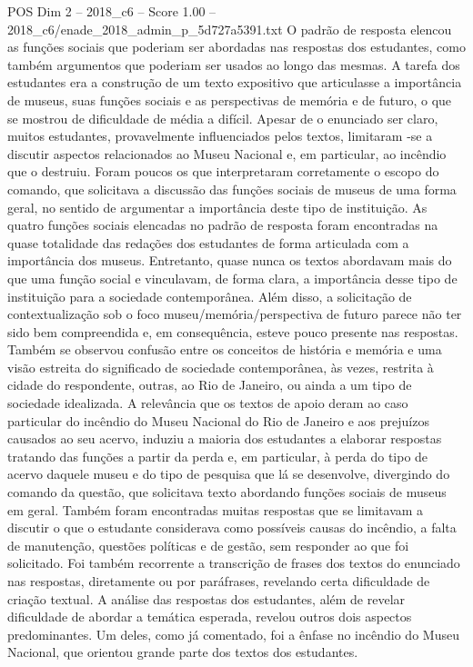 \begin{textsample}{POS Dim 2 – 2018\_c6 – Score 1.00 – 2018\_c6/enade\_2018\_admin\_p\_5d727a5391.txt}
O padrão de resposta elencou as funções sociais que poderiam ser abordadas nas respostas dos estudantes, como também argumentos que poderiam ser usados ao longo das mesmas.
A tarefa dos estudantes era a construção de um texto expositivo que articulasse a importância de museus, suas funções sociais e as perspectivas de memória e de futuro, o que se mostrou de dificuldade de média a difícil.
Apesar de o enunciado ser claro, muitos estudantes, provavelmente influenciados pelos textos, limitaram -se a discutir aspectos relacionados ao Museu Nacional e, em particular, ao incêndio que o destruiu.
Foram poucos os que interpretaram corretamente o escopo do comando, que solicitava a discussão das funções sociais de museus de uma forma geral, no sentido de argumentar a importância deste tipo de instituição.
As quatro funções sociais elencadas no padrão de resposta foram encontradas na quase totalidade das redações dos estudantes de forma articulada com a importância dos museus.
Entretanto, quase nunca os textos abordavam mais do que uma função social e vinculavam, de forma clara, a importância desse tipo de instituição para a sociedade contemporânea.
Além disso, a solicitação de contextualização sob o foco museu/memória/perspectiva de futuro parece não ter sido bem compreendida e, em consequência, esteve pouco presente nas respostas.
Também se observou confusão entre os conceitos de história e memória e uma visão estreita do significado de sociedade contemporânea, às vezes, restrita à cidade do respondente, outras, ao Rio de Janeiro, ou ainda a um tipo de sociedade idealizada.
A relevância que os textos de apoio deram ao caso particular do incêndio do Museu Nacional do Rio de Janeiro e aos prejuízos causados ao seu acervo, induziu a maioria dos estudantes a elaborar respostas tratando das funções a partir da perda e, em particular, à perda do tipo de acervo daquele museu e do tipo de pesquisa que lá se desenvolve, divergindo do comando da questão, que solicitava texto abordando funções sociais de museus em geral.
Também foram encontradas muitas respostas que se limitavam a discutir o que o estudante considerava como possíveis causas do incêndio, a falta de manutenção, questões políticas e de gestão, sem responder ao que foi solicitado.
Foi também recorrente a transcrição de frases dos textos do enunciado nas respostas, diretamente ou por paráfrases, revelando certa dificuldade de criação textual.
A análise das respostas dos estudantes, além de revelar dificuldade de abordar a temática esperada, revelou outros dois aspectos predominantes.
Um deles, como já comentado, foi a ênfase no incêndio do Museu Nacional, que orientou grande parte dos textos dos estudantes.

\end{textsample}
